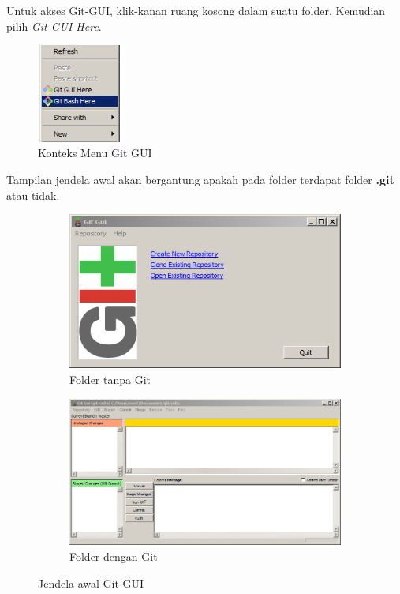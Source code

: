 \documentclass[12pt]{book}
\begin{document}
	Untuk akses Git-GUI, klik-kanan ruang kosong dalam suatu folder.
	Kemudian pilih \textit{Git GUI Here}.

	\begin{figure}[!ht]
		\centering
		\includegraphics[width=80pt]{images/githere0}
		\caption{Konteks Menu Git GUI}
	\end{figure}

	Tampilan jendela awal akan bergantung apakah pada folder terdapat folder \textbf{.git} atau tidak.

	\begin{figure}[!ht]
		\centering
		\begin{subfigure}[b]{0.25\textwidth}
			\includegraphics[width=\textwidth]{images/gitgui0}
			\caption{Folder tanpa Git}
		\end{subfigure}
		\begin{subfigure}[b]{0.55\textwidth}
			\includegraphics[width=\textwidth]{images/gitgui1}
			\caption{Folder dengan Git}
		\end{subfigure}
		\caption{Jendela awal Git-GUI}
	\end{figure}
\end{document}
